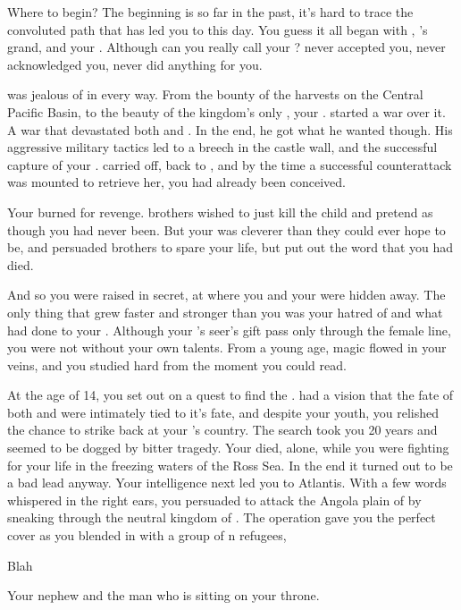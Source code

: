 \documentclass[char]{NeptuneBall}
\begin{document}
\name{\cManta{}}

Where to begin? The beginning is so far in the past, it's hard to trace the convoluted path that has led you to this day. You guess it all began with \cExExKing{\King} \cExExKing{}, \cExExKing{\King} \cKing{}'s grand\cExExKing{\parent}, and your \cExExKing{\parent}. Although can you really call \cExExKing{\them} your \cExExKing{\parent}? \cExExKing{\They} never accepted you, never acknowledged you, never did anything for you.

\cExExKing{\They} was jealous of \pPacifica{} in every way. From the bounty of the harvests on the Central Pacific Basin, to the beauty of the kingdom's only \cMother{\prince}, your \cMother{\parent} \cMother{\MYname}. \cExExKing{} started a war over it. A war that devastated both \pPacifica{} and \pAtlantis{}. In the end, he got what he wanted though. His aggressive military tactics led to a breech in the castle wall, and the successful capture of your \cMother{\parent}. \cExExKing{} carried \cMother{\them} off, back to \pAtlantis{}, and by the time a successful counterattack was mounted to retrieve her, you had already been conceived.

Your \cMother{\parent} burned for revenge. \cMother{\Them} brothers wished to just kill the child and pretend as though you had never been. But your \cMother{\parent} was cleverer than they could ever hope to be, and persuaded \cMother{\them} brothers to spare your life, but put out the word that you had died.

And so you were raised in secret, at \pAssassin{} where you and your \cMother{\parent} were hidden away. The only thing that grew faster and stronger than you was your hatred of \pAtlantis{} and what \cExExKing{} had done to your \cMother{\parent}. Although your \cMother{\parent}'s seer's gift pass only through the female line, you were not without your own talents. From a young age, magic flowed in your veins, and you studied hard from the moment you could read.

At the age of 14, you set out on a quest to find the \iTriton{\MYname}. \cMother{} had a vision that the fate of both \pPacifica{} and \pAtlantis{} were intimately tied to it's fate, and despite your youth, you relished the chance to strike back at your \cExExKing{\parent}'s country. The search took you 20 years and seemed to be dogged by bitter tragedy. Your \cMother{} died, alone, while you were fighting for your life in the freezing waters of the Ross Sea. In the end it turned out to be a bad lead anyway. Your intelligence next led you to Atlantis. With a few words whispered in the right ears, you persuaded \pPacifica{} to attack the Angola plain of \pAtlantis{} by sneaking through the neutral kingdom of \pIndia{}. The operation gave you the perfect cover as you blended in with a group of \pAtlantis{}n refugees, 



\begin{itemz}[Goals]
  \item Blah
\end{itemz}

\begin{contacts}
  \contact{\cKing{}} Your nephew and the man who is sitting on your throne.
\end{contacts}
\end{document}
